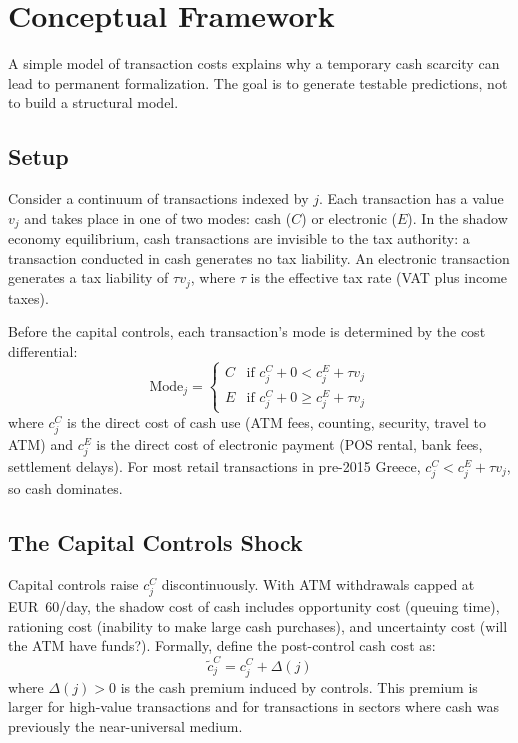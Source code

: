\documentclass[12pt]{article}
\begin{document}
\section{Conceptual Framework}
\label{sec:framework}

A simple model of transaction costs explains why a temporary cash scarcity can lead to permanent formalization. The goal is to generate testable predictions, not to build a structural model.

\subsection{Setup}

Consider a continuum of transactions indexed by $j$. Each transaction has a value $v_j$ and takes place in one of two modes: cash ($C$) or electronic ($E$). In the shadow economy equilibrium, cash transactions are invisible to the tax authority: a transaction conducted in cash generates no tax liability. An electronic transaction generates a tax liability of $\tau v_j$, where $\tau$ is the effective tax rate (VAT plus income taxes).

Before the capital controls, each transaction's mode is determined by the cost differential:
\begin{equation}
    \text{Mode}_j = \begin{cases} C & \text{if } c_j^C + 0 < c_j^E + \tau v_j \\ E & \text{if } c_j^C + 0 \geq c_j^E + \tau v_j \end{cases}
\end{equation}
where $c_j^C$ is the direct cost of cash use (ATM fees, counting, security, travel to ATM) and $c_j^E$ is the direct cost of electronic payment (POS rental, bank fees, settlement delays). For most retail transactions in pre-2015 Greece, $c_j^C < c_j^E + \tau v_j$, so cash dominates.

\subsection{The Capital Controls Shock}

Capital controls raise $c_j^C$ discontinuously. With ATM withdrawals capped at EUR~60/day, the shadow cost of cash includes opportunity cost (queuing time), rationing cost (inability to make large cash purchases), and uncertainty cost (will the ATM have funds?). Formally, define the post-control cash cost as:
\begin{equation}
    \tilde{c}_j^C = c_j^C + \Delta(j)
\end{equation}
where $\Delta(j) > 0$ is the cash premium induced by controls. This premium is larger for high-value transactions and for transactions in sectors where cash was previously the near-universal medium.
\end{document}
